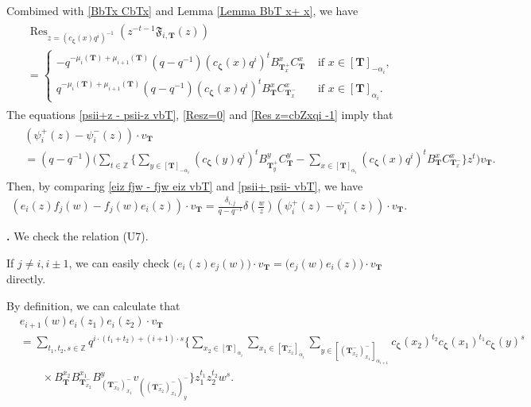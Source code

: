\documentclass[12pt]{amsart}
\def \para{\refstepcounter{thm} \par\medskip\noindent
                \textbf{\thethm .} }
\numberwithin{equation}{thm}
\newcommand\ZZ{\mathbb Z}
\newcommand\bT{\mathbf T}
\newcommand\fF{\mathfrak F}
\renewcommand\a{\alpha}  %
\renewcommand\d{\delta}  %
\newcommand\Bz{\boldsymbol\zeta}
\newcommand\Res{\operatorname{Res}}
\newcounter{ni}
\begin{document}
Combimed with \eqref{BbTx CbTx} and Lemma \ref{Lemma BbT x+ x}, we have 
\begin{align}
\label{Res z=cbZxqi -1}
\begin{split}
&\Res_{z = (c_{\Bz}(x)q^i)^{-1}} (z^{-t-1} \fF_{i,\bT}(z)) 
\\
&= \begin{cases}
	- q^{-\mu_i(\bT) + \mu_{i+1} (\bT) } (q-q^{-1}) (c_{\Bz}(x) q^i)^t  B_{\bT_{x}^+}^{x} C_{\bT}^x 
		& \text{ if } x \in [\bT]_{-\a_i}, 
	\\[0.5em]
	q^{- \mu_i(\bT) + \mu_{i+1} (\bT)} (q-q^{-1}) (c_{\Bz} (x) q^i)^t  B_{\bT}^x  C_{\bT_x^-}^x 
		& \text{ if } x \in [\bT]_{\a_i}. 
\end{cases}
\end{split}
\end{align}
The equations \eqref{psii+z - psii-z vbT}, \eqref{Resz=0} and \eqref{Res z=cbZxqi -1} imply that 
\begin{align}
\label{psii+ psii- vbT}
\begin{split}
&(\psi_i^+(z) - \psi_i^-(z)) \cdot v_{\bT} 
\\
&= (q-q^{-1}) \Big( \sum_{t \in \ZZ} \Big\{ 
	\sum_{y \in [\bT]_{-\a_i}} (c_{\Bz}(y) q^i)^t B_{\bT_y^+}^y C_{\bT}^y 
	- \sum_{x \in [\bT]_{\a_i}} (c_{\Bz} (x) q^i)^t B_{\bT}^x C_{\bT_x^-}^x 
	\Big\} z^t \Big) v_{\bT}. 
\end{split} 
\end{align}
Then, by comparing \eqref{eiz fjw - fjw eiz vbT} and \eqref{psii+ psii- vbT}, we have 
\begin{align*}
(e_i(z) f_j(w) - f_j(w) e_i(z)) \cdot v_{\bT} 
= \frac{\d_{i,j}}{q-q^{-1}} \d \left( \frac{w}{z} \right) (\psi_i^+(z) - \psi_i^-(z)) \cdot v_{\bT}. 
\end{align*}

\para 
We check the relation (U7). 

If $j \not=i, i \pm 1$,  
we can easily check $\big( e_i(z) e_j(w) \big) \cdot v_{\bT} = \big( e_j(w) e_i(z) \big) \cdot v_{\bT}$ directly. 

By definition, we can calculate that 
\begin{align*}
& e_{i+1} (w) e_i(z_1) e_i(z_2) \cdot v_{\bT} 
\\
&= \sum_{t_1,t_2,s\in \ZZ} q^{i \cdot (t_1+t_2) + (i+1) \cdot s} 
	\Big\{ \sum_{x_2 \in [\bT]_{\a_i}} \sum_{x_1 \in [\bT_{x_2}^-]_{\a_i}} \sum_{y \in [(\bT_{x_2}^-)_{x_1}^-]_{\a_{i+1}}} 
		c_{\Bz}(x_2)^{t_2} c_{\Bz} (x_1)^{t_1}   c_{\Bz} (y)^s 
		\\ & \qquad \times 
		B_{\bT}^{x_2} B_{\bT_{x_2}^-}^{x_1} B_{(\bT_{x_2}^-)_{x_1}^-}^y v_{((\bT_{x_2}^-)_{x_1}^-)_y^-} \Big\} 
		z_1^{t_1} z_2^{t_2} w^s. 
\end{align*}
\end{document}
